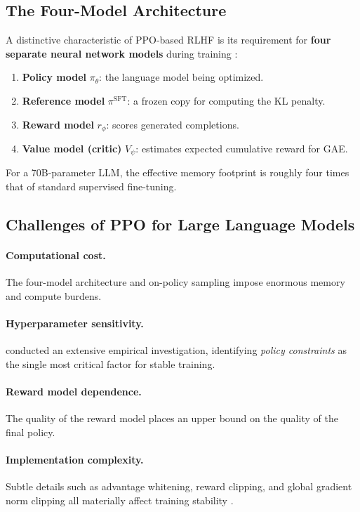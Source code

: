 \documentclass[12pt,a4paper]{report}
\theoremstyle{definition}
\begin{document}
\subsection{The Four-Model Architecture}

A distinctive characteristic of PPO-based RLHF is its requirement for \textbf{four separate neural network models} during training \cite{ouyang2022instructgpt, zheng2023secrets}:
\begin{enumerate}
    \item \textbf{Policy model} $\pi_\theta$: the language model being optimized.
    \item \textbf{Reference model} $\pi^{\text{SFT}}$: a frozen copy for computing the KL penalty.
    \item \textbf{Reward model} $r_\phi$: scores generated completions.
    \item \textbf{Value model (critic)} $V_\psi$: estimates expected cumulative reward for GAE.
\end{enumerate}
For a 70B-parameter LLM, the effective memory footprint is roughly four times that of standard supervised fine-tuning.

\subsection{Challenges of PPO for Large Language Models}

\paragraph{Computational cost.} The four-model architecture and on-policy sampling impose enormous memory and compute burdens.

\paragraph{Hyperparameter sensitivity.} \cite{zheng2023secrets} conducted an extensive empirical investigation, identifying \emph{policy constraints} as the single most critical factor for stable training.

\paragraph{Reward model dependence.} The quality of the reward model places an upper bound on the quality of the final policy.

\paragraph{Implementation complexity.} Subtle details such as advantage whitening, reward clipping, and global gradient norm clipping all materially affect training stability \cite{zheng2023secrets}.
\end{document}
